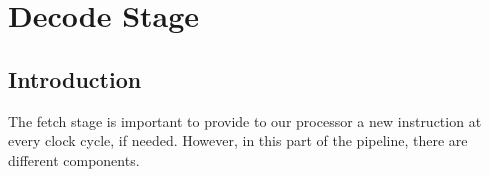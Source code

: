 \section{Decode Stage}
\label{chap_dec}

\subsection{Introduction}
The fetch stage is important to provide to our processor a new instruction at every clock cycle, if needed.  However, in this part of the pipeline, there are different components.